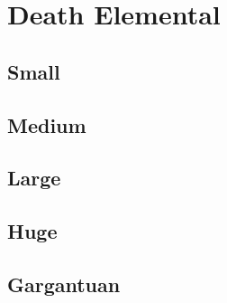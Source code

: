 \section{Death Elemental}

\subsection{Small}

\subsection{Medium}

\subsection{Large}

\subsection{Huge}

\subsection{Gargantuan}
